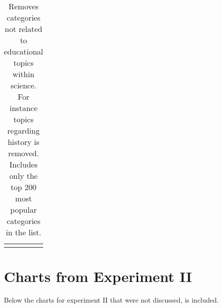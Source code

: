 \begin{appendices}
\begin{longtable} {|| p{20em} | p{5em} ||}
  \hline
\caption{Removes categories not related to educational topics within science. For instance topics regarding history is removed. Includes only the top 200 most popular categories in the list.}
\label{table:whitelistV2}
\end{longtable}


\chapter{Charts from Experiment II}

Below the charts for experiment II that were not discussed, is included.



\end{appendices}
